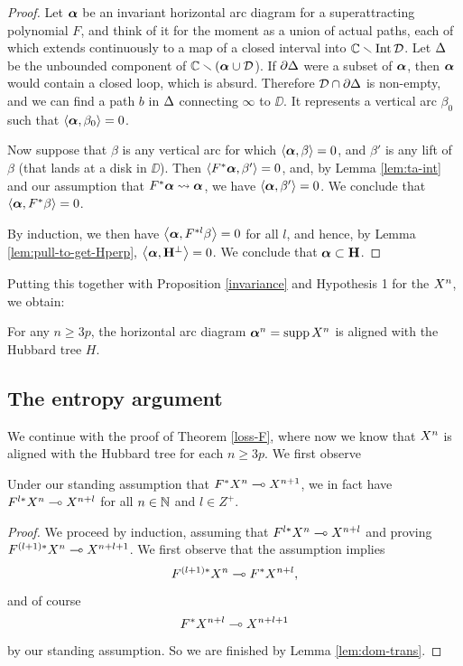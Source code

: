 \begin{proof}
Let  ${\mbox{\boldmath$\alpha$} }$ be an invariant horizontal arc diagram for a superattracting polynomial $F$,
and think of it for the moment as a union of actual paths,
each of which extends continuously to a map of a closed interval into ${\Bbb C} \smallsetminus \operatorname{Int} {\mathcal D}$. 
Let ${\Delta}$ be the unbounded component of ${\Bbb C}\smallsetminus ({\mbox{\boldmath$\alpha$} } \cup {\mathcal D}$).
If $\partial {\Delta}$ were a subset of ${\mbox{\boldmath$\alpha$} }$,
then ${\mbox{\boldmath$\alpha$} }$ would contain a closed loop, which is absurd.
Therefore ${\mathcal D} \cap \partial{\Delta}$ is non-empty,
and we can find a path $b$ in ${\Delta}$ connecting $\infty$ to $\DD$. 
It represents a vertical arc $\beta_0$ such that  $\langle{\mbox{\boldmath$\alpha$} }, \beta_0\rangle=0$.

Now suppose that $\beta$ is any vertical arc for which $\langle{\mbox{\boldmath$\alpha$} }, \beta\rangle=0$,
and $\beta'$ is any lift of $\beta$ (that lands at a disk in $\DD$).
Then $\langle F^*{\mbox{\boldmath$\alpha$} }, \beta'\rangle=0$,
and, 
by Lemma \ref{lem:ta-int} and our assumption that $F^*{\mbox{\boldmath$\alpha$} } \leadsto {\mbox{\boldmath$\alpha$} }$,
we have $\langle {\mbox{\boldmath$\alpha$} }, \beta'\rangle=0$.
We conclude that $\left< {\mbox{\boldmath$\alpha$} }, F^*\beta \right> = 0$.

By induction,
we then have 
$\left< {\mbox{\boldmath$\alpha$} }, F^{*l}\beta \right> = 0$ for all $l$,
and hence, 
by Lemma \ref{lem:pull-to-get-Hperp},
$\left< {\mbox{\boldmath$\alpha$} }, {\mathbf{H}}^\perp \right> = 0$. 
We conclude that ${\mbox{\boldmath$\alpha$} } \subset {\mathbf{H}}$. 
\end{proof}
Putting this together with Proposition \ref{invariance} and Hypothesis 1 for the $X^{n}$,
we obtain:

\begin{cor}\label{alignment}
  For any  $n\geq 3p$, the horizontal arc diagram ${\mbox{\boldmath$\alpha$} }^n = \operatorname{supp}  X^{n}$ is
aligned with the Hubbard tree $H$.
\end{cor}


\subsection{The entropy argument}
We continue with the proof of Theorem \ref{loss-F},
where now we know that $X^{n}$ is aligned with the Hubbard tree for each $n \ge 3p$. 
We first observe
\begin{lemma} \label{lem:dom-iter}
Under our standing assumption that $F^* X^{n} \multimap X^{n+1}$,  we in fact have 
$F^{l*} X^{n} \multimap X^{n+l}$ for all $n \in {\Bbb N}$ and $l \in Z^+$.
\end{lemma}
\begin{proof}
We proceed by induction,
assuming that $F^{l*} X^{n} \multimap X^{n+l}$ and proving $F^{(l+1)*} X^{n} \multimap X^{n+l + 1}$. 
We first observe that the assumption implies $$F^{(l+1)*} X^{n} \multimap F^* X^{n+l},$$ 
and of course $$F^* X^{n+l} \multimap X^{n+l+1}$$ by our standing assumption.
So we are finished by Lemma \ref{lem:dom-trans}.
\end{proof}

